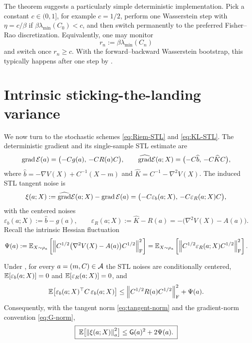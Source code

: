 \begin{remark}
The theorem suggests a particularly simple deterministic implementation. Pick a constant
$c\in(0,1]$, for example $c=1/2$, perform one Wasserstein step with
$\eta=c/\beta$ if $\beta\lambda_{\min}(C_0)<c$, and then switch permanently to the preferred
Fisher--Rao discretization. Equivalently, one may monitor
\[
    r_n:=\beta\lambda_{\min}(C_n)
\]
and switch once $r_n\ge c$. With the forward--backward Wasserstein bootstrap, this typically
happens after one step by .
\end{remark}

\section{Intrinsic sticking-the-landing variance}

We now turn to the stochastic schemes \eqref{eq:Riem-STL} and \eqref{eq:KL-STL}. The
deterministic gradient and its single-sample STL estimate are
\[
    \operatorname{grad}\mathcal{E}(a)=\bigl(-Cg(a),\,-CR(a)C\bigr),
    \qquad
    \widehat{\operatorname{grad}}\mathcal{E}(a;X)=\bigl(-C\widehat b,\,-C\widehat KC\bigr),
\]
where $\widehat b=-\nabla V(X)+C^{-1}(X-m)$ and $\widehat K=C^{-1}-\nabla^2V(X)$. The induced
STL tangent noise is
\begin{equation}
\label{eq:STL-tangent-noise}
    \xi(a;X)
    :=
    \widehat{\operatorname{grad}}\mathcal{E}(a;X)-\operatorname{grad}\mathcal{E}(a)
    =
    \bigl(-C\varepsilon_b(a;X),\,-C\varepsilon_R(a;X)C\bigr),
\end{equation}
with the centered noises
\[
    \varepsilon_b(a;X):=\widehat b-g(a),
    \qquad
    \varepsilon_R(a;X):=\widehat K-R(a)=-\bigl(\nabla^2V(X)-A(a)\bigr).
\]
Recall the intrinsic Hessian fluctuation
\begin{equation}
\label{eq:Psi}
    \Psi(a)
    :=
    \mathbb{E}_{X\sim\rho_a}
    \left[
        \left\lVert C^{1/2}\bigl(\nabla^2V(X)-A(a)\bigr)C^{1/2}\right\rVert_{\mathrm{F}}^2
    \right]
    =
    \mathbb{E}_{X\sim\rho_a}
    \left[
        \left\lVert C^{1/2}\varepsilon_R(a;X)C^{1/2}\right\rVert_{\mathrm{F}}^2
    \right].
\end{equation}

\begin{lemma}
\label{lem:intrinsic-STL}
Under , for every $a=(m,C)\in\mathcal{A}$ the STL noises are
conditionally centered, $\mathbb{E}[\varepsilon_b(a;X)]=0$ and $\mathbb{E}[\varepsilon_R(a;X)]=0$, and
\begin{equation}
\label{eq:intrinsic-mean}
    \mathbb{E}\bigl[\varepsilon_b(a;X)^\top C\,\varepsilon_b(a;X)\bigr]
    \leq
    \left\lVert C^{1/2}R(a)C^{1/2}\right\rVert_{\mathrm{F}}^2+\Psi(a).
\end{equation}
Consequently, with the tangent norm \eqref{eq:tangent-norm} and the gradient-norm
convention \eqref{eq:G-norm},
\begin{equation}
\label{eq:intrinsic-STL}
    \boxed{\;
    \mathbb{E}\bigl[\left\lVert \xi(a;X)\right\rVert_a^2\bigr]
    \leq
    \mathsf{G}(a)^2+2\Psi(a).
    \;}
\end{equation}
\end{lemma}

